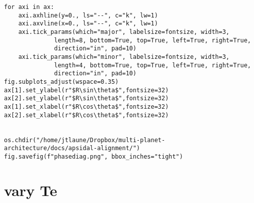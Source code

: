 \documentclass[11pt]{article}
\begin{document}
\begin{verbatim}
for axi in ax:
    axi.axhline(y=0., ls="--", c="k", lw=1)
    axi.axvline(x=0., ls="--", c="k", lw=1)
    axi.tick_params(which="major", labelsize=fontsize, width=3,
		      length=8, bottom=True, top=True, left=True, right=True,
		      direction="in", pad=10)
    axi.tick_params(which="minor", labelsize=fontsize, width=3,
		      length=4, bottom=True, top=True, left=True, right=True,
		      direction="in", pad=10)
fig.subplots_adjust(wspace=0.35)
ax[1].set_ylabel(r"$R\sin\theta$",fontsize=32)
ax[2].set_ylabel(r"$R\sin\theta$",fontsize=32)
ax[1].set_xlabel(r"$R\cos\theta$",fontsize=32)
ax[2].set_xlabel(r"$R\cos\theta$",fontsize=32)


os.chdir("/home/jtlaune/Dropbox/multi-planet-architecture/docs/apsidal-alignment/")
fig.savefig(f"phasediag.png", bbox_inches="tight")

\end{verbatim}

\section{vary Te}
\label{sec:org8226aa8}
\end{document}
